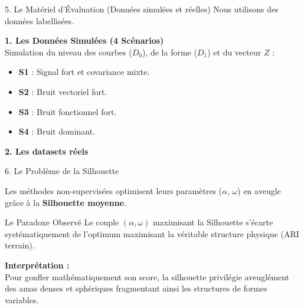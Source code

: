 \documentclass[10pt, compress]{beamer}
\begin{document}
\begin{frame}{5. Le Matériel d'Évaluation (Données simulées et réelles)}
Nous utilisons des données labellisées.

\vspace{0.5em}

\textbf{1. Les Données Simulées (4 Scénarios)} \\
Simulation du niveau des courbes ($D_0$), de la forme ($D_1$) et du vecteur $Z$ :
\begin{itemize}
    \item \textbf{S1} : Signal fort et covariance mixte.
    \item \textbf{S2} : Bruit vectoriel fort.
    \item \textbf{S3} : Bruit fonctionnel fort.
    \item \textbf{S4} : Bruit dominant.
\end{itemize}
\vspace{0.5em}
\textbf{2. Les datasets réels} \\
\begin{table}
\centering
\renewcommand{\arraystretch}{1.1}
\end{table}
\end{frame}

\begin{frame}{6. Le Problème de la Silhouette}

Les méthodes non-supervisées optimisent leurs paramètres ($\alpha$, $\omega$) en aveugle grâce à la \textbf{Silhouette moyenne}.

\vspace{1em}
\begin{alertblock}{Le Paradoxe Observé}
Le couple $(\alpha, \omega)$ maximisant la Silhouette s'écarte systématiquement de l'optimum maximisant la véritable structure physique (ARI terrain).
\end{alertblock}

\vspace{0.5em}
\textbf{Interprétation :}\\
Pour gonfler mathématiquement son score, la silhouette privilégie aveuglément des amas denses et sphériques fragmentant ainsi les structures de formes variables.
\end{frame}
\end{document}
